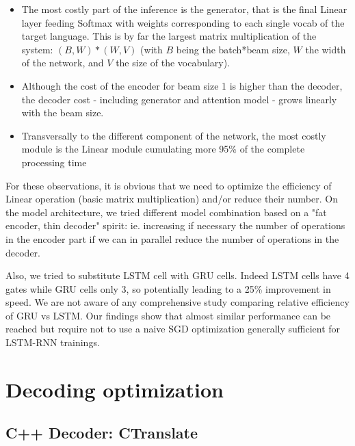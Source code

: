 \documentclass[11pt,a4paper]{article}
\begin{document}
\begin{itemize}
\item The most costly part of the inference is the generator, that is the final Linear layer feeding Softmax with weights corresponding to each single vocab of the target language. This is by far the largest matrix multiplication of the system: $(B,W) * (W,V)$ (with $B$ being the batch*beam size, $W$ the width of the network, and $V$ the size of the vocabulary).
\item Although the cost of the encoder for beam size 1 is higher than the decoder, the decoder cost - including generator and attention model - grows linearly with the beam size.
\item Transversally to the different component of the network, the most costly module is the Linear module cumulating more 95\% of the complete processing time
\end{itemize}

For these observations, it is obvious that we need to optimize the efficiency of Linear operation (basic matrix multiplication) and/or reduce their number. On the model architecture, we tried different model combination based on a "fat encoder, thin decoder" spirit: ie. increasing if necessary the number of operations in the encoder part if we can in parallel reduce the number of operations in the decoder.

Also, we tried to substitute LSTM cell with GRU cells. Indeed LSTM cells have 4 gates while GRU cells only 3, so potentially leading to a 25\% improvement in speed. We are not aware of any comprehensive study comparing relative efficiency of GRU vs LSTM. Our findings show that almost similar performance can be reached but require not to use a naive SGD optimization generally sufficient for LSTM-RNN trainings.

\section{Decoding optimization}




\subsection{C++ Decoder: CTranslate}
\end{document}
